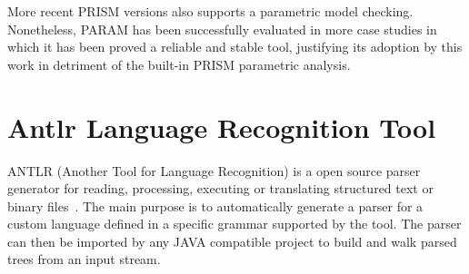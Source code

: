 More recent PRISM versions also supports a parametric model checking. Nonetheless, PARAM has been successfully evaluated in more case studies in which it has been proved a reliable and stable tool, justifying its adoption by this work in detriment of the built-in PRISM parametric analysis. 


%
%
%
%
%
%
%
%
%


\section{Antlr Language Recognition Tool}

ANTLR (Another Tool for Language Recognition) is a open source parser generator for reading, processing, executing or translating structured text or binary files~\cite{Parr:2007}. The main purpose is to automatically generate a parser for a custom language defined in a specific grammar supported by the tool. The parser can then be imported by any JAVA compatible project to build and walk parsed trees from an input stream. 

